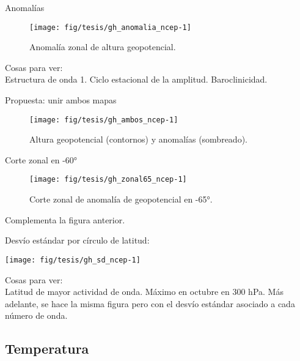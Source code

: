 \documentclass[es-AR,]{tufte-book}
\begin{document}
Anomalías

\begin{figure*}

{\centering \texttt{[image: fig/tesis/gh\_anomalia\_ncep-1]} 

}

\caption[Anomalía zonal de altura geopotencial]{Anomalía zonal de altura geopotencial.}\label{fig:gh_anomalia_ncep}
\end{figure*}

Cosas para ver:\\
Estructura de onda 1. Ciclo estacional de la amplitud. Baroclinicidad.

Propuesta: unir ambos mapas

\begin{figure*}

{\centering \texttt{[image: fig/tesis/gh\_ambos\_ncep-1]} 

}

\caption[Altura geopotencial (contornos) y anomalías (sombreado)]{Altura geopotencial (contornos) y anomalías (sombreado).}\label{fig:gh_ambos_ncep}
\end{figure*}

Corte zonal en -60°

\begin{figure}

{\centering \texttt{[image: fig/tesis/gh\_zonal65\_ncep-1]} 

}

\caption[Corte zonal de anomalía de geopotencial en -65°]{Corte zonal de anomalía de geopotencial en -65°.}\label{fig:gh_zonal65_ncep}
\end{figure}

Complementa la figura anterior.

Desvío estándar por círculo de latitud:

\begin{center}\texttt{[image: fig/tesis/gh\_sd\_ncep-1]} \end{center}

Cosas para ver:\\
Latitud de mayor actividad de onda. Máximo en octubre en 300 hPa. Más
adelante, se hace la misma figura pero con el desvío estándar asociado a
cada número de onda.

\subsection{Temperatura}\label{temperatura}
\end{document}
